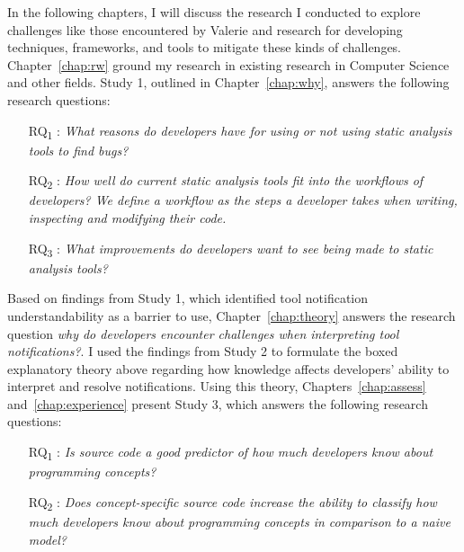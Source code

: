 In the following chapters, I will discuss the research I conducted to explore challenges like those encountered by Valerie and research for developing techniques, frameworks, and tools to mitigate these kinds of challenges.
Chapter~\ref{chap:rw} ground my research in existing research in Computer Science and other fields.
Study 1, outlined in Chapter~\ref{chap:why}, answers the following research questions:
\begin{itemize}
    \item [RQ\textsubscript{1}]: \textit{What reasons do developers have for using or not using static analysis tools to find bugs?}
    \item [RQ\textsubscript{2}]: \textit{How well do current static analysis tools fit into the workflows of developers? We define a workflow as the steps a developer takes when writing, inspecting and modifying their code.}
    \item [RQ\textsubscript{3}]: \textit{What improvements do developers want to see being made to static analysis tools?}
\end{itemize}

Based on findings from Study 1, which identified tool notification understandability as a barrier to use, Chapter~\ref{chap:theory} answers the research question \textit{why do developers encounter challenges when interpreting tool notifications?}.
I used the findings from Study 2 to formulate the boxed explanatory theory above regarding how knowledge affects developers' ability to interpret and resolve notifications.
Using this theory, Chapters~\ref{chap:assess} and~\ref{chap:experience} present Study 3, which answers the following research questions:
\begin{itemize}
    \item [RQ\textsubscript{1}]: \textit{Is source code a good predictor of how much developers know about programming concepts?}
	\item [RQ\textsubscript{2}]: \textit{Does concept-specific source code increase the ability to classify how much developers know about programming concepts in comparison to a naive model?}
\end{itemize}

